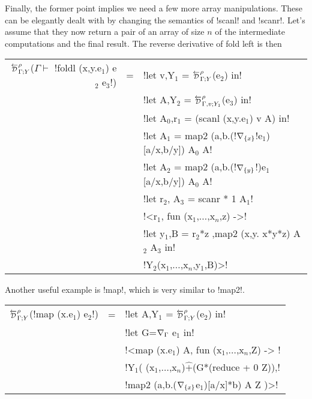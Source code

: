 Finally, the former point implies we need a few more array manipulations.
These can be elegantly dealt with by changing the semantics of !scanl! and !scanr!. 
Let's assume that they now return a pair of an array of size $n$ 
of the intermediate computations and the final result.
The reverse derivative of fold left is then

\begin{center}
\begin{tabular}{r c l}
    $\directD{\rho}{\Gamma}{Y}$($\Gamma\vdash $ !foldl (x,y.e$_1$) e$_2$ e$_3$!) &=&
            !let v,Y$_1$ = $\directD{\rho}{\Gamma}{Y}$(e$_2$) in! \\
            && !let A,Y$_2$ = $\directD{\rho}{\Gamma,v}{Y_1}$(e$_3$) in! \\
            && !let A$_0$,r$_1$ = (scanl (x,y.e$_1$) v A) in! \\
            && !let A$_1$ = map2 (a,b.(!$\nabla_{\{x\}}$!e$_1$)[a/x,b/y]) A$_0$ A! \\
            && !let A$_2$ = map2 (a,b.(!$\nabla_{\{y\}}$!)e$_1$[a/x,b/y]) A$_0$ A! \\
            && !let r$_2$, A$_3$ = scanr * 1 A$_1$! \\
            && !<r$_1$, fun (x$_1$,$\ldots$,x$_n$,z) ->! \\
            && !let y$_1$,B = r$_2$*z ,map2 (x,y. x*y*z) A$_2$ A$_3$ in! \\
            && !Y$_2$(x$_1$,$\ldots$,x$_n$,y$_1$,B)>! \\
\end{tabular}
\end{center}

Another useful example is !map!, which is very similar to !map2!.

\begin{center}
    \begin{tabular}{r c l}
        $\directD{\rho}{\Gamma}{Y}$(!map (x.e$_{1}$) e$_{2}$!) &=&  
            !let A,Y$_{1}$ = $\directD{\rho}{\Gamma}{Y}$(e$_{2}$) in! \\
            && !let G=$\nabla_{\Gamma}$ e$_{1}$ in!\\
            && !<map (x.e$_{1}$) A, fun (x$_{1}$,$\ldots$,x$_n$,Z) -> !\\
            && !Y$_{1}$( (x$_{1}$,$\ldots$,x$_n$)$\widehat{+}$(G*(reduce + 0 Z)),!\\
            && \quad\quad !map2 (a,b.($\nabla_{\{x\}}$e$_{1}$)[a/x]*b) A Z )>!\\
    \end{tabular}
\end{center}

